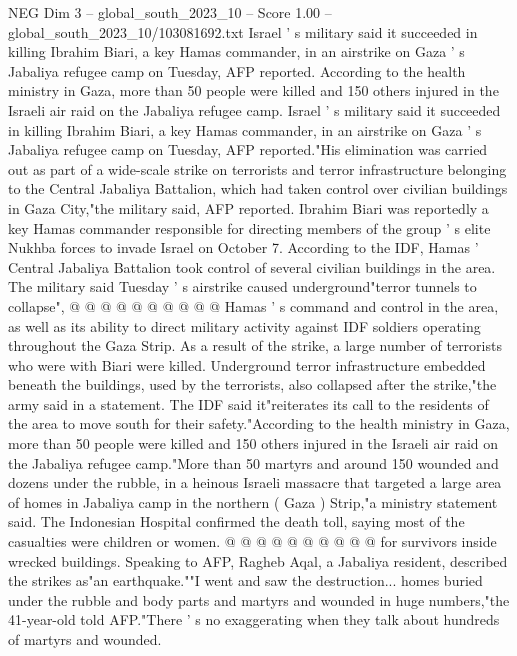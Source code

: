 \begin{textsample}{NEG Dim 3 – global\_south\_2023\_10 – Score 1.00 – global\_south\_2023\_10/103081692.txt}  \label{ex:f3_neg_026}
Israel ' s military said it succeeded in killing Ibrahim Biari, a key Hamas commander, in an airstrike on Gaza ' s Jabaliya refugee camp on Tuesday, AFP reported.
According to the health ministry in Gaza, more than 50 people were killed and 150 others injured in the Israeli air raid on the Jabaliya refugee camp.
Israel ' s military said it succeeded in killing Ibrahim Biari, a key Hamas commander, in an airstrike on Gaza ' s Jabaliya refugee camp on Tuesday, AFP reported."His elimination was carried out as part of a wide-scale strike on terrorists and terror infrastructure belonging to the Central Jabaliya Battalion, which had taken control over civilian buildings in Gaza City,"the military said, AFP reported.
Ibrahim Biari was reportedly a key Hamas commander responsible for directing members of the group ' s elite Nukhba forces to invade Israel on October 7.
According to the IDF, Hamas ' Central Jabaliya Battalion took control of several civilian buildings in the area.
The military said Tuesday ' s airstrike caused underground"terror tunnels to collapse", @ @ @ @ @ @ @ @ @ @ Hamas ' s command and control in the area, as well as its ability to direct military activity against IDF soldiers operating throughout the Gaza Strip.
As a result of the strike, a large number of terrorists who were with Biari were killed.
Underground terror infrastructure embedded beneath the buildings, used by the terrorists, also collapsed after the strike,"the army said in a statement.
The IDF said it"reiterates its call to the residents of the area to move south for their safety."According to the health ministry in Gaza, more than 50 people were killed and 150 others injured in the Israeli air raid on the Jabaliya refugee camp."More than 50 martyrs and around 150 wounded and dozens under the rubble, in a heinous Israeli massacre that targeted a large area of homes in Jabaliya camp in the northern ( Gaza ) Strip,"a ministry statement said.
The Indonesian Hospital confirmed the death toll, saying most of the casualties were children or women. @ @ @ @ @ @ @ @ @ @ for survivors inside wrecked buildings.
Speaking to AFP, Ragheb Aqal, a Jabaliya resident, described the strikes as"an earthquake.""I went and saw the destruction... homes buried under the rubble and body parts and martyrs and wounded in huge numbers,"the 41-year-old told AFP."There ' s no exaggerating when they talk about hundreds of martyrs and wounded.

\end{textsample}
